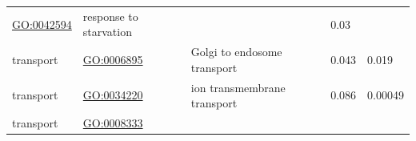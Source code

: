 \documentclass[
]{article}
\begin{document}
\begin{longtable}[]{@{}lllll@{}}
\begin{minipage}[t]{0.17\columnwidth}
\url{GO:0042594}\strut
\end{minipage} & \begin{minipage}[t]{0.17\columnwidth}\raggedright
response to starvation\strut
\end{minipage} & \begin{minipage}[t]{0.17\columnwidth}\raggedright
\strut
\end{minipage} & \begin{minipage}[t]{0.17\columnwidth}\raggedright
0.03\strut
\end{minipage}\tabularnewline
\begin{minipage}[t]{0.17\columnwidth}\raggedright
transport\strut
\end{minipage} & \begin{minipage}[t]{0.17\columnwidth}\raggedright
\url{GO:0006895}\strut
\end{minipage} & \begin{minipage}[t]{0.17\columnwidth}\raggedright
Golgi to endosome transport\strut
\end{minipage} & \begin{minipage}[t]{0.17\columnwidth}\raggedright
0.043\strut
\end{minipage} & \begin{minipage}[t]{0.17\columnwidth}\raggedright
0.019\strut
\end{minipage}\tabularnewline
\begin{minipage}[t]{0.17\columnwidth}\raggedright
transport\strut
\end{minipage} & \begin{minipage}[t]{0.17\columnwidth}\raggedright
\url{GO:0034220}\strut
\end{minipage} & \begin{minipage}[t]{0.17\columnwidth}\raggedright
ion transmembrane transport\strut
\end{minipage} & \begin{minipage}[t]{0.17\columnwidth}\raggedright
0.086\strut
\end{minipage} & \begin{minipage}[t]{0.17\columnwidth}\raggedright
0.00049\strut
\end{minipage}\tabularnewline
\begin{minipage}[t]{0.17\columnwidth}\raggedright
transport\strut
\end{minipage} & \begin{minipage}[t]{0.17\columnwidth}\raggedright
\url{GO:0008333}\strut
\end{minipage} & \begin{minipage}[t]{0.17\columnwidth}\raggedright

\end{minipage}
\end{longtable}
\end{document}
